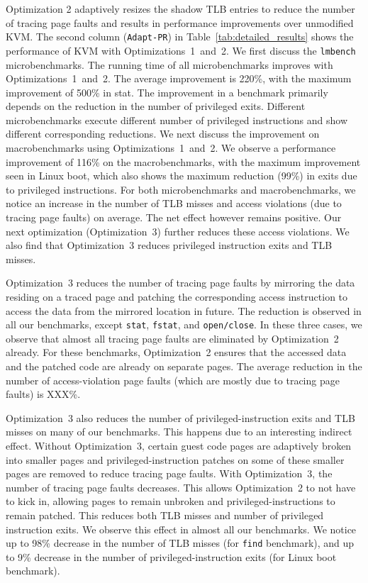 \documentclass[10pt,twocolumn]{article}
\begin{document}
Optimization 2 adaptively resizes the shadow TLB entries to reduce
the number of tracing page faults and results in
performance improvements over unmodified KVM. The second column ({\tt Adapt-PR})
in Table~\ref{tab:detailed_results} shows the performance of KVM with
Optimizations~1~and~2.
We first discuss the {\tt lmbench} microbenchmarks. The running time
of all microbenchmarks improves with Optimizations~1~and~2. The average improvement
is 220\%, with the maximum improvement of 500\% in stat. The improvement in
a benchmark primarily depends on the reduction in the number of privileged exits.
Different microbenchmarks execute different number of privileged
instructions and show different corresponding reductions.
We next discuss the improvement on macrobenchmarks using Optimizations~1~and~2.
We observe a performance improvement of 116\% on the macrobenchmarks, with the
maximum improvement seen in Linux boot, which also shows the maximum reduction
(99\%) in exits due to privileged instructions.
For both microbenchmarks and macrobenchmarks, we notice an increase in the
number of TLB misses and access violations (due to tracing page faults)
on average. The net effect however remains positive. Our next
optimization (Optimization~3) further
reduces these access violations. We also find that Optimization~3 reduces
privileged instruction exits and TLB misses.

Optimization~3 reduces the number of tracing page faults
by mirroring the data residing on a traced page and patching the corresponding
access instruction to access the data from the mirrored location in future.
The reduction is observed in all our benchmarks, except {\tt stat}, {\tt fstat},
and {\tt open/close}. In these three cases, we observe that
almost all tracing page faults are eliminated by Optimization~2 already.
For these benchmarks, Optimization~2 ensures that the accessed data and the
patched code are already on separate pages. The average reduction in the number
of access-violation page faults (which are mostly due to tracing
page faults) is XXX\%.

Optimization~3 also reduces the number of privileged-instruction
exits and TLB misses on many of our benchmarks.
This happens due to an interesting indirect effect.
Without Optimization~3, certain guest code pages are adaptively broken into smaller pages
and privileged-instruction patches on some of these smaller pages are removed to reduce
tracing page faults. With Optimization~3, the number of tracing
page faults decreases. This allows Optimization~2 to not have to kick in, allowing
pages to remain unbroken and privileged-instructions to remain patched.
This reduces both TLB misses and number of privileged instruction exits.
We observe this effect in almost all our benchmarks. We notice up to
98\% decrease in the number of TLB misses (for {\tt find} benchmark),
and up to 9\% decrease in the number of privileged-instruction
exits (for Linux boot benchmark).
\end{document}
